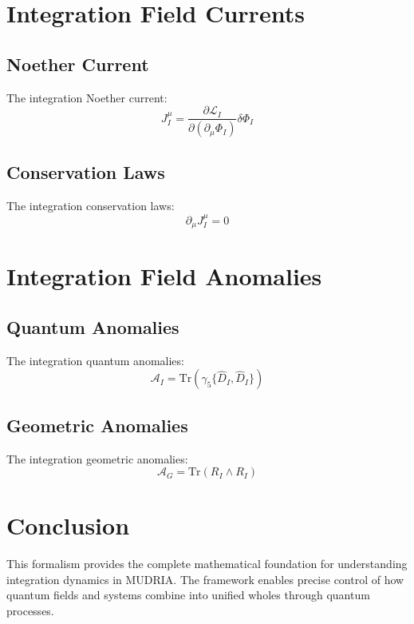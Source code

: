 \documentclass[12pt]{article}
\begin{document}
\section{Integration Field Currents}
\subsection{Noether Current}
The integration Noether current:
\begin{equation}
J_I^\mu = \frac{\partial\mathcal{L}_I}{\partial(\partial_\mu\Phi_I)}\delta\Phi_I
\end{equation}
\subsection{Conservation Laws}
The integration conservation laws:
\begin{equation}
\partial_\mu J_I^\mu = 0
\end{equation}
\section{Integration Field Anomalies}
\subsection{Quantum Anomalies}
The integration quantum anomalies:
\begin{equation}
\mathcal{A}_I = \text{Tr}(\gamma_5\{\hat{D}_I,\hat{D}_I\})
\end{equation}
\subsection{Geometric Anomalies}
The integration geometric anomalies:
\begin{equation}
\mathcal{A}_G = \text{Tr}(R_I\wedge R_I)
\end{equation}
\section{Conclusion}
This formalism provides the complete mathematical foundation for understanding integration dynamics in MUDRIA. The framework enables precise control of how quantum fields and systems combine into unified wholes through quantum processes.
\end{document}
